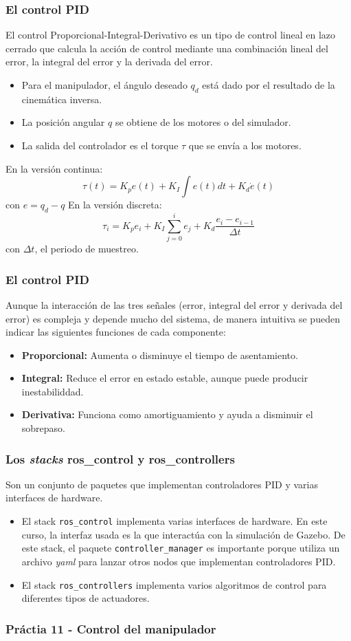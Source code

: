 \begin{frame}\frametitle{El control PID}
  El control Proporcional-Integral-Derivativo es un tipo de control lineal en lazo cerrado que calcula la acción de control mediante una combinación lineal del error, la integral del error y la derivada del error.
  \begin{itemize}
  \item Para el manipulador, el ángulo deseado $q_d$ está dado por el resultado de la cinemática inversa. 
  \item La posición angular $q$ se obtiene de los motores o del simulador.
  \item La salida del controlador es el torque $\tau$ que se envía a los motores.
  \end{itemize}
  En la versión continua:
  \[\tau(t) = K_p e(t) + K_I \int e(t)dt + K_d \dot{e}(t)\]
  con $e = q_d - q$
  En la versión discreta:
  \[\tau_i = K_p e_i + K_I\sum_{j=0}^i e_j + K_d\frac{e_i - e_{i-1}}{\Delta t}\]
  con $\Delta t$, el periodo de muestreo. 
\end{frame}

\begin{frame}\frametitle{El control PID}
  Aunque la interacción de las tres señales (error, integral del error y derivada del error) es compleja y depende mucho del sistema, de manera intuitiva se pueden indicar las siguientes funciones de cada componente:
  \begin{itemize}
  \item \textbf{Proporcional:} Aumenta o disminuye el tiempo de asentamiento.
  \item \textbf{Integral:} Reduce el error en estado estable, aunque puede producir inestabiliddad.
  \item \textbf{Derivativa:} Funciona como amortiguamiento y ayuda a disminuir el sobrepaso. 
  \end{itemize}
\end{frame}

\begin{frame}\frametitle{Los \textit{stacks} ros\_control y ros\_controllers}
  Son un conjunto de paquetes que implementan controladores PID y varias interfaces de hardware.
  \begin{itemize}
  \item El stack \texttt{ros\_control} implementa varias interfaces de hardware. En este curso, la interfaz usada es la que interactúa con la simulación de Gazebo. De este stack, el paquete \texttt{controller\_manager} es importante porque utiliza un archivo \textit{yaml} para lanzar otros nodos que implementan controladores PID. 
  \item El stack \texttt{ros\_controllers} implementa varios algoritmos de control para diferentes tipos de actuadores. 
  \end{itemize}
\end{frame}

\begin{frame}\frametitle{Práctia 11 - Control del manipulador}
\end{frame}